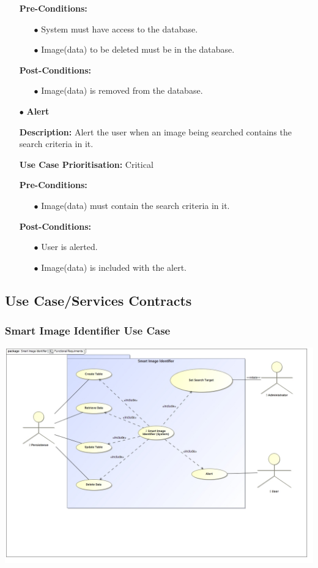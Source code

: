 \documentclass[a4paper,12pt]{report}
\begin{document}
\begin{itemize}
		\textbf{Pre-Conditions:}
		\begin{itemize}
			\item[$\bullet$]System must have access to the database.
			\item[$\bullet$]Image(data) to be deleted must be in the database.
			\\
		\end{itemize}
		\textbf{Post-Conditions: }
		\begin{itemize}
			\item[$\bullet$]Image(data) is removed from the database.
			\\
		\end{itemize}
		\item[$\bullet$]\textbf{Alert}\newline

		\textbf{Description:} Alert the user when an image being searched contains the search criteria in it.\newline
		
		\textbf{Use Case Prioritisation:} Critical\newline

		\textbf{Pre-Conditions:}
		\begin{itemize}
			\item[$\bullet$]Image(data) must contain the search criteria in it.
			\\
		\end{itemize}
		\textbf{Post-Conditions: }
		\begin{itemize}
			\item[$\bullet$]User is alerted.
			\item[$\bullet$]Image(data) is included with the alert.
			\\
		\end{itemize}
	\end{itemize}
\subsection{Use Case/Services Contracts}
	\subsubsection{Smart Image Identifier Use Case}
	\includegraphics[width=1\textwidth]{./FunctionalRequirments.jpg}\\[1.5cm]
\end{document}
